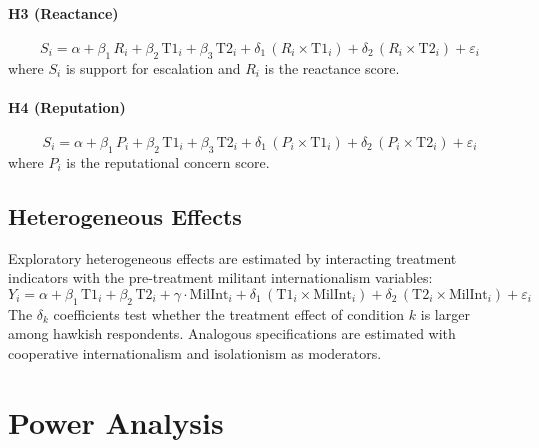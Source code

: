   \paragraph{H3 (Reactance)}
  \begin{equation}
    S_i = \alpha
        + \beta_1\,R_i
        + \beta_2\,\text{T1}_i + \beta_3\,\text{T2}_i
        + \delta_1\,(R_i \times \text{T1}_i)
        + \delta_2\,(R_i \times \text{T2}_i)
        + \varepsilon_i
    \label{eq:h3}
  \end{equation}
  where $S_i$ is support for escalation and $R_i$ is the reactance
  score. 

  \paragraph{H4 (Reputation)}
  \begin{equation}
    S_i = \alpha
        + \beta_1\,P_i
        + \beta_2\,\text{T1}_i + \beta_3\,\text{T2}_i
        + \delta_1\,(P_i \times \text{T1}_i)
        + \delta_2\,(P_i \times \text{T2}_i)
        + \varepsilon_i
    \label{eq:h4}
  \end{equation}
  where $P_i$ is the reputational concern score. 

  \subsection{Heterogeneous Effects}

  Exploratory heterogeneous effects are estimated by interacting
  treatment indicators with the pre-treatment militant internationalism
  variables:
  \begin{equation}
    Y_i = \alpha
        + \beta_1\,\text{T1}_i + \beta_2\,\text{T2}_i
        + \gamma\cdot\text{MilInt}_i
        + \delta_1\,(\text{T1}_i \times \text{MilInt}_i)
        + \delta_2\,(\text{T2}_i \times \text{MilInt}_i)
        + \varepsilon_i
  \end{equation}
  The $\delta_k$ coefficients test whether the treatment effect of
  condition $k$ is larger among hawkish respondents. Analogous
  specifications are estimated with cooperative internationalism and
  isolationism as moderators.
\section{Power Analysis}



